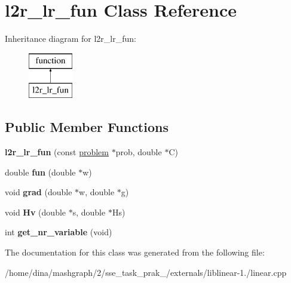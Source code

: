 \hypertarget{classl2r__lr__fun}{\section{l2r\-\_\-lr\-\_\-fun Class Reference}
\label{classl2r__lr__fun}
}
Inheritance diagram for l2r\-\_\-lr\-\_\-fun\-:\begin{figure}[H]
\begin{center}
\leavevmode
\includegraphics[height=2.000000cm]{classl2r__lr__fun}
\end{center}
\end{figure}
\subsection*{Public Member Functions}
\begin{DoxyCompactItemize}
\item 
\hypertarget{classl2r__lr__fun_a11033da3bd7769ffa3fb2683dd6f6ec9}{{\bfseries l2r\-\_\-lr\-\_\-fun} (const \hyperlink{structproblem}{problem} $\ast$prob, double $\ast$C)}\label{classl2r__lr__fun_a11033da3bd7769ffa3fb2683dd6f6ec9}

\item 
\hypertarget{classl2r__lr__fun_a5138070a88ef3f52161ca77aeb83f0fd}{double {\bfseries fun} (double $\ast$w)}\label{classl2r__lr__fun_a5138070a88ef3f52161ca77aeb83f0fd}

\item 
\hypertarget{classl2r__lr__fun_af86ce06fbdf7914beaebdf0c80743114}{void {\bfseries grad} (double $\ast$w, double $\ast$g)}\label{classl2r__lr__fun_af86ce06fbdf7914beaebdf0c80743114}

\item 
\hypertarget{classl2r__lr__fun_a454e51b5f15eaf65488989f1c82b963d}{void {\bfseries Hv} (double $\ast$s, double $\ast$Hs)}\label{classl2r__lr__fun_a454e51b5f15eaf65488989f1c82b963d}

\item 
\hypertarget{classl2r__lr__fun_a9e1dff2de1cd4d392fd674bf2ab6a27b}{int {\bfseries get\-\_\-nr\-\_\-variable} (void)}\label{classl2r__lr__fun_a9e1dff2de1cd4d392fd674bf2ab6a27b}

\end{DoxyCompactItemize}


The documentation for this class was generated from the following file\-:\begin{DoxyCompactItemize}
\item 
/home/dina/mashgraph/2/sse\-\_\-task\-\_\-prak\-\_/externals/liblinear-\/1./linear.\-cpp\end{DoxyCompactItemize}
